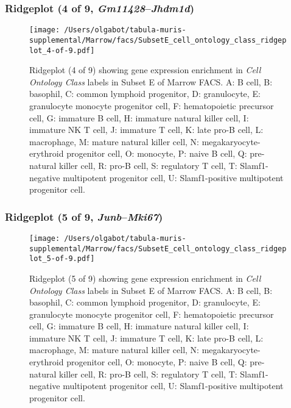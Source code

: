 \subsubsection{Ridgeplot (4 of 9, \emph{Gm11428}--\emph{Jhdm1d})}
\begin{figure}[h]
\centering
\texttt{[image: /Users/olgabot/tabula-muris-supplemental/Marrow/facs/SubsetE\_cell\_ontology\_class\_ridgeplot\_4-of-9.pdf]}

\caption{ Ridgeplot (4 of 9)  showing gene expression enrichment in \emph{Cell Ontology Class} labels in Subset E of Marrow FACS. A: B cell, B: basophil, C: common lymphoid progenitor, D: granulocyte, E: granulocyte monocyte progenitor cell, F: hematopoietic precursor cell, G: immature B cell, H: immature natural killer cell, I: immature NK T cell, J: immature T cell, K: late pro-B cell, L: macrophage, M: mature natural killer cell, N: megakaryocyte-erythroid progenitor cell, O: monocyte, P: naive B cell, Q: pre-natural killer cell, R: pro-B cell, S: regulatory T cell, T: Slamf1-negative multipotent progenitor cell, U: Slamf1-positive multipotent progenitor cell.}
\end{figure}


\clearpage

\subsubsection{Ridgeplot (5 of 9, \emph{Junb}--\emph{Mki67})}
\begin{figure}[h]
\centering
\texttt{[image: /Users/olgabot/tabula-muris-supplemental/Marrow/facs/SubsetE\_cell\_ontology\_class\_ridgeplot\_5-of-9.pdf]}

\caption{ Ridgeplot (5 of 9)  showing gene expression enrichment in \emph{Cell Ontology Class} labels in Subset E of Marrow FACS. A: B cell, B: basophil, C: common lymphoid progenitor, D: granulocyte, E: granulocyte monocyte progenitor cell, F: hematopoietic precursor cell, G: immature B cell, H: immature natural killer cell, I: immature NK T cell, J: immature T cell, K: late pro-B cell, L: macrophage, M: mature natural killer cell, N: megakaryocyte-erythroid progenitor cell, O: monocyte, P: naive B cell, Q: pre-natural killer cell, R: pro-B cell, S: regulatory T cell, T: Slamf1-negative multipotent progenitor cell, U: Slamf1-positive multipotent progenitor cell.}
\end{figure}


\clearpage

